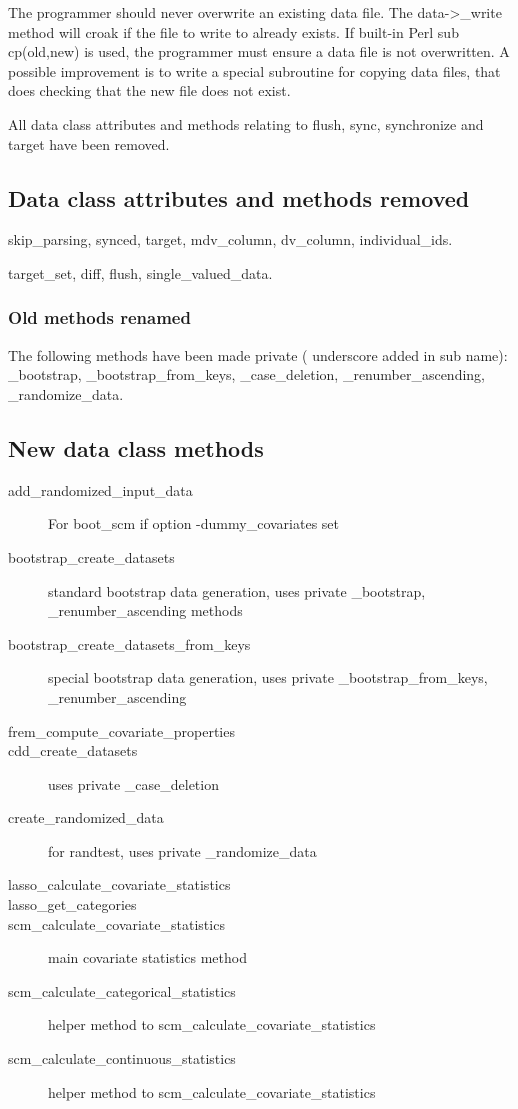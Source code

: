 The programmer should never overwrite 
an existing data file.
The data->\_write method will croak if the file to write to already exists. If built-in Perl sub cp(old,new) is
used, the programmer must ensure a data file is not overwritten. A possible improvement is to write a special subroutine
for copying data files, that does checking that the new file does not exist.

All data class attributes and methods relating to flush, sync, synchronize and target have been removed. 

\subsection{Data class attributes and methods removed}
skip\_parsing, synced, target, mdv\_column, dv\_column, individual\_ids.

target\_set, diff, flush, single\_valued\_data.

\subsubsection{Old methods renamed}
The following methods have been made private ( underscore added in sub name): 
\_bootstrap, \_bootstrap\_from\_keys, \_case\_deletion, \_renumber\_ascending, \_randomize\_data.

\subsection{New data class methods}
\begin{description} 
\item[add\_randomized\_input\_data] For boot\_scm if option -dummy\_covariates set
\item[bootstrap\_create\_datasets] standard bootstrap data generation, uses private \_bootstrap, \_renumber\_ascending methods
\item[bootstrap\_create\_datasets\_from\_keys] special bootstrap data generation, uses private \_bootstrap\_from\_keys, \_renumber\_ascending
\item[frem\_compute\_covariate\_properties]
\item[cdd\_create\_datasets] uses private \_case\_deletion
\item[create\_randomized\_data] for randtest, uses private \_randomize\_data
\item[lasso\_calculate\_covariate\_statistics]
\item[lasso\_get\_categories]
\item[scm\_calculate\_covariate\_statistics] main covariate statistics method
\item[scm\_calculate\_categorical\_statistics] helper method to scm\_calculate\_covariate\_statistics
\item[scm\_calculate\_continuous\_statistics] helper method to scm\_calculate\_covariate\_statistics
\end{description}
